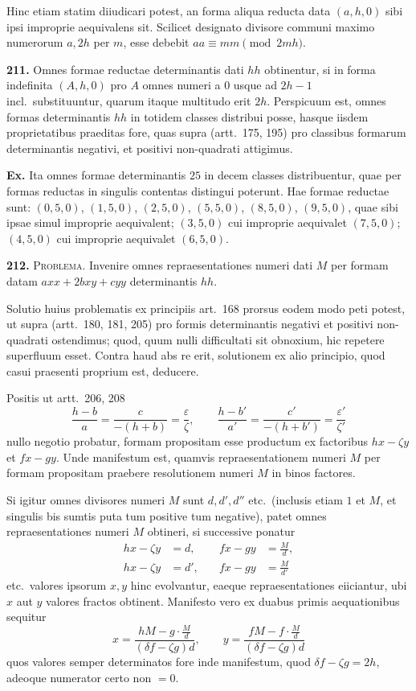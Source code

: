 \documentclass[12pt,a4paper]{article}
\theoremstyle{plain}
\theoremstyle{definition}
\theoremstyle{remark}
\begin{document}
Hinc etiam statim diiudicari potest, an forma aliqua reducta data $(a,h,0)$ sibi ipsi improprie aequivalens sit. Scilicet designato divisore communi maximo numerorum $a,2h$ per $m$, esse debebit $aa\equiv mm\pmod{2mh}$.

\textbf{211.}
Omnes formae reductae determinantis dati $hh$ obtinentur, si in forma indefinita $(A,h,0)$ pro $A$ omnes numeri a $0$ usque ad $2h-1$ incl.\ substituuntur, quarum itaque multitudo erit $2h$. Perspicuum est, omnes formas determinantis $hh$ in totidem classes distribui posse, hasque iisdem proprietatibus praeditas fore, quas supra (artt.~175, 195) pro classibus formarum determinantis negativi, et positivi non-quadrati attigimus.

\textbf{Ex.} Ita omnes formae determinantis $25$ in decem classes distribuentur, quae per formas reductas in singulis contentas distingui poterunt. Hae formae reductae sunt: $(0,5,0)$, $(1,5,0)$, $(2,5,0)$, $(5,5,0)$, $(8,5,0)$, $(9,5,0)$, quae sibi ipsae simul improprie aequivalent; $(3,5,0)$ cui improprie aequivalet $(7,5,0)$; $(4,5,0)$ cui improprie aequivalet $(6,5,0)$.

\textbf{212.} \textsc{Problema.} Invenire omnes repraesentationes numeri dati $M$ per formam datam $axx+2bxy+cyy$ determinantis $hh$.

Solutio huius problematis ex principiis art.~168 prorsus eodem modo peti potest, ut supra (artt.~180, 181, 205) pro formis determinantis negativi et positivi non-quadrati ostendimus; quod, quum nulli difficultati sit obnoxium, hic repetere superfluum esset. Contra haud abs re erit, solutionem ex alio principio, quod casui praesenti proprium est, deducere.

Positis ut artt.~206, 208
\[
\frac{h-b}{a}=\frac{c}{-(h+b)}=\frac{\varepsilon}{\zeta},\qquad \frac{h-b'}{a'}=\frac{c'}{-(h+b')}=\frac{\varepsilon'}{\zeta'}
\]
nullo negotio probatur, formam propositam esse productum ex factoribus $hx-\zeta y$ et $fx-gy$. Unde manifestum est, quamvis repraesentationem numeri $M$ per formam propositam praebere resolutionem numeri $M$ in binos factores.

Si igitur omnes divisores numeri $M$ sunt $d,d',d''$ etc.\ (inclusis etiam $1$ et $M$, et singulis bis sumtis puta tum positive tum negative), patet omnes repraesentationes numeri $M$ obtineri, si successive ponatur
\begin{align*}
hx-\zeta y &= d,\quad &fx-gy &= \tfrac{M}{d},\\
hx-\zeta y &= d',\quad &fx-gy &= \tfrac{M}{d'}
\end{align*}
etc.\ valores ipsorum $x,y$ hinc evolvantur, eaeque repraesentationes eiiciantur, ubi $x$ aut $y$ valores fractos obtinent. Manifesto vero ex duabus primis aequationibus sequitur
\[
x=\frac{hM-g\cdot\frac{M}{d}}{(\delta f-\zeta g)d},\qquad y=\frac{fM-f\cdot\frac{M}{d}}{(\delta f-\zeta g)d}
\]
quos valores semper determinatos fore inde manifestum, quod $\delta f-\zeta g=2h$, adeoque numerator certo non $=0$.
\end{document}
